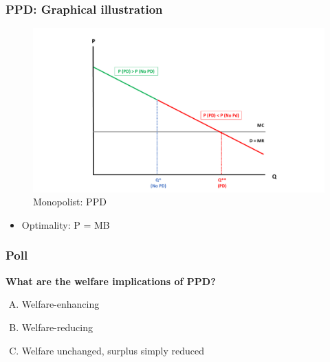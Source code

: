 \documentclass[10pt]{beamer}
\begin{document}
\begin{frame} 
	\frametitle{PPD: Graphical illustration}
	
	
	\begin{figure}[H]
		\centering
		\includegraphics[width=0.9\linewidth]{pd}
		\caption{Monopolist: PPD \\ 
			\label{fig:ppd}}
		
	\end{figure}
	
	\begin{itemize}
		\item Optimality: P = MB
	\end{itemize}
	

\end{frame}

\begin{frame} 
	\frametitle{Poll}
	
	\begin{center}
		\textbf{What are the welfare implications of PPD?}
	\end{center}	
	
	\begin{enumerate}[(A)]
		\item Welfare-enhancing 
		\item Welfare-reducing 
		\item Welfare unchanged, surplus simply reduced
	\end{enumerate}

		
\end{frame}
\end{document}
